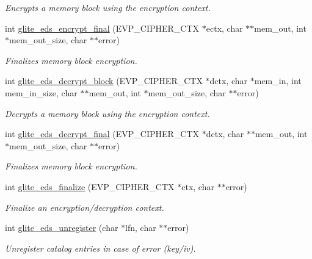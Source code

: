\begin{CompactItemize}
\begin{CompactList}\small\item\em Encrypts a memory block using the encryption context. \item\end{CompactList}\item 
int \hyperlink{eds-simple_8h_a5}{glite\_\-eds\_\-encrypt\_\-final} (EVP\_\-CIPHER\_\-CTX $\ast$ectx, char $\ast$$\ast$mem\_\-out, int $\ast$mem\_\-out\_\-size, char $\ast$$\ast$error)
\begin{CompactList}\small\item\em Finalizes memory block encryption. \item\end{CompactList}\item 
int \hyperlink{eds-simple_8h_a6}{glite\_\-eds\_\-decrypt\_\-block} (EVP\_\-CIPHER\_\-CTX $\ast$dctx, char $\ast$mem\_\-in, int mem\_\-in\_\-size, char $\ast$$\ast$mem\_\-out, int $\ast$mem\_\-out\_\-size, char $\ast$$\ast$error)
\begin{CompactList}\small\item\em Decrypts a memory block using the encryption context. \item\end{CompactList}\item 
int \hyperlink{eds-simple_8h_a7}{glite\_\-eds\_\-decrypt\_\-final} (EVP\_\-CIPHER\_\-CTX $\ast$dctx, char $\ast$$\ast$mem\_\-out, int $\ast$mem\_\-out\_\-size, char $\ast$$\ast$error)
\begin{CompactList}\small\item\em Finalizes memory block encryption. \item\end{CompactList}\item 
int \hyperlink{eds-simple_8h_a8}{glite\_\-eds\_\-finalize} (EVP\_\-CIPHER\_\-CTX $\ast$ctx, char $\ast$$\ast$error)
\begin{CompactList}\small\item\em Finalize an encryption/decryption context. \item\end{CompactList}\item 
int \hyperlink{eds-simple_8h_a9}{glite\_\-eds\_\-unregister} (char $\ast$lfn, char $\ast$$\ast$error)
\begin{CompactList}\small\item\em Unregister catalog entries in case of error (key/iv). \item\end{CompactList}\end{CompactItemize}


